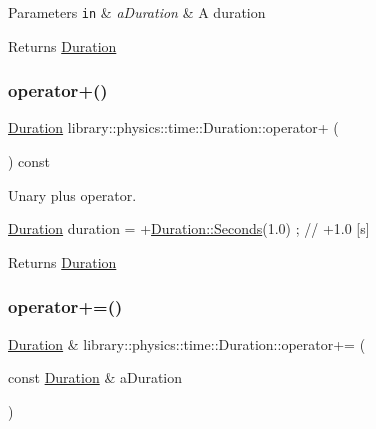 \begin{DoxyParams}[1]{Parameters}
\mbox{\tt in}  & {\em a\+Duration} & A duration \\
\hline
\end{DoxyParams}
\begin{DoxyReturn}{Returns}
\hyperlink{classlibrary_1_1physics_1_1time_1_1_duration}{Duration} 
\end{DoxyReturn}
\mbox{\label{classlibrary_1_1physics_1_1time_1_1_duration_a315c20670e53373e2d9f47ff07c6c09c}} 
\subsubsection{\texorpdfstring{operator+()}{operator+()}\hspace{0.1cm}{\footnotesize\ttfamily [2/2]}}
{\footnotesize\ttfamily \hyperlink{classlibrary_1_1physics_1_1time_1_1_duration}{Duration} library\+::physics\+::time\+::\+Duration\+::operator+ (\begin{DoxyParamCaption}{ }\end{DoxyParamCaption}) const}



Unary plus operator. 


\begin{DoxyCode}
\hyperlink{classlibrary_1_1physics_1_1time_1_1_duration_a0a70efcf487a841da572afcf00001f64}{Duration} duration = +\hyperlink{classlibrary_1_1physics_1_1time_1_1_duration_ae10891c94a1b2278c444cb44b37132f1}{Duration::Seconds}(1.0) ; \textcolor{comment}{// +1.0 [s]}
\end{DoxyCode}


\begin{DoxyReturn}{Returns}
\hyperlink{classlibrary_1_1physics_1_1time_1_1_duration}{Duration} 
\end{DoxyReturn}
\mbox{\label{classlibrary_1_1physics_1_1time_1_1_duration_a2d2848688c326591ea1a406e5a0275d0}} 
\subsubsection{\texorpdfstring{operator+=()}{operator+=()}}
{\footnotesize\ttfamily \hyperlink{classlibrary_1_1physics_1_1time_1_1_duration}{Duration} \& library\+::physics\+::time\+::\+Duration\+::operator+= (\begin{DoxyParamCaption}\item[{const \hyperlink{classlibrary_1_1physics_1_1time_1_1_duration}{Duration} \&}]{a\+Duration }\end{DoxyParamCaption})}



